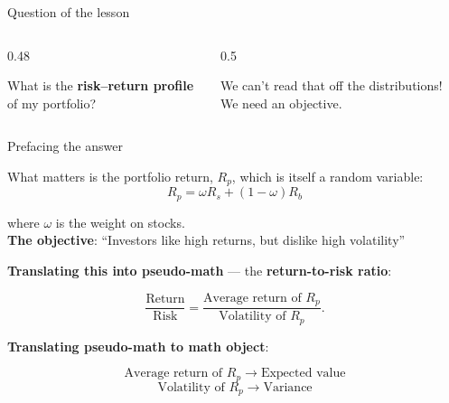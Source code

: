 \documentclass[9pt,english,aspectratio=169]{beamer}
\begin{document}
\begin{frame}{Question of the lesson}
  \vspace{0.3em}
    \begin{columns}[T]
    \begin{column}{0.48\textwidth}
    \begin{questionbox}
      What is the \textbf{risk--return profile} of my portfolio?
    \end{questionbox}
    \end{column}
    \pause
    \begin{column}{0.5\textwidth}
      \begin{insightbox}
        We can't read that off the distributions! We need an objective.
      \end{insightbox}
    \end{column}
  \end{columns}



\end{frame}

\begin{frame}{Prefacing the answer}
  
  What matters is the portfolio return, $R_p$, which is itself a random variable:
  \[R_p = \omega R_s + (1-\omega) R_b \]

  where $\omega$ is the weight on stocks. \\
  \pause
  \vspace{1em}
  \textbf{The objective}: ``Investors like high returns, but dislike high volatility'' \\
    \vspace{1em}

  \pause 
  \textbf{Translating this into pseudo-math} --- the \textbf{return-to-risk
  ratio}:

  \[\frac{\text{Return}}{\text{Risk}} = \frac{\text{Average return of } R_p}{\text{Volatility of } R_p}.\]
  \pause 
  
  \textbf{Translating pseudo-math to math object}:
  \begin{insightbox}
      \[ \text{Average return of } R_p \rightarrow \text{Expected value}\]
      \vspace{-1em}
      \[ \text{Volatility of } R_p \rightarrow \text{Variance}\]
  \end{insightbox}

\end{frame}

\end{document}
